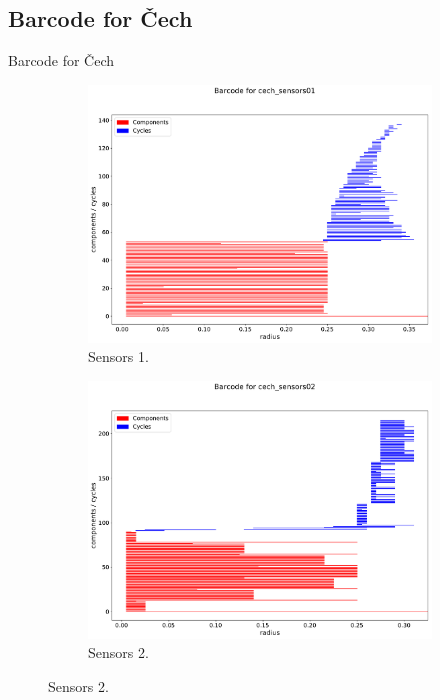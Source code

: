 \documentclass{beamer}
\begin{document}
\subsection{Barcode for Čech}

\begin{frame}{Barcode for Čech}

\begin{figure}[!ht]
\centering
\begin{subfigure}{.5\textwidth}
	\centering
	\includegraphics[scale=0.19]{used_images/barcode_cech_sensors01.pdf}
	\caption{Sensors 1.}
\end{subfigure}%
\begin{subfigure}{.5\textwidth}
	\centering
	\includegraphics[scale=0.19]{used_images/barcode_cech_sensors02.pdf}
	\caption{Sensors 2.}
\end{subfigure}%

\end{figure}
\end{frame}
\end{document}
